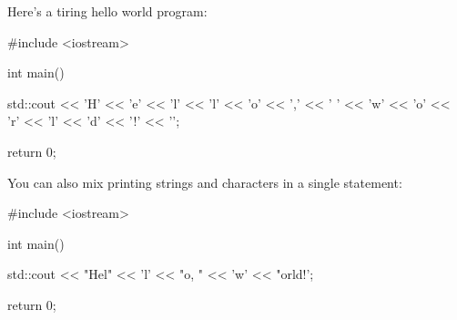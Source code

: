Here's a tiring hello world program:
\begin{console}
#include <iostream>

int main()
{
    std::cout << 'H' << 'e' << 'l' << 'l' << 'o'
              << ',' << ' ' 
              << 'w' << 'o' << 'r' << 'l' << 'd' 
              << '!' 
              << '\n';
         
    return 0;
}
\end{console}

You can also mix printing strings and characters in a single statement:
\begin{console}
#include <iostream>

int main()
{
    std::cout << "Hel" << 'l' << "o, " 
              << 'w' << "orld!\n';
         
    return 0;
}
\end{console}

